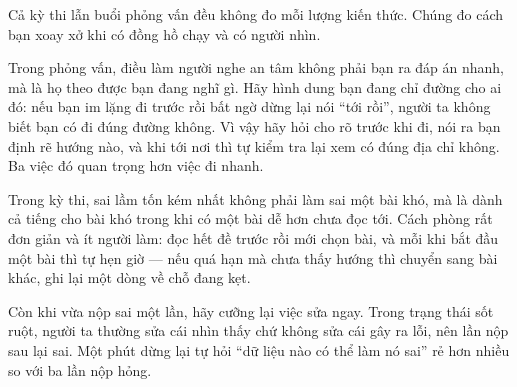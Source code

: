 \documentclass[../../algorithm.tex]{subfiles}
\begin{document}
\begin{dongian}
Cả kỳ thi lẫn buổi phỏng vấn đều không đo mỗi lượng kiến thức. Chúng đo cách bạn xoay xở khi có đồng hồ chạy và có người nhìn.

Trong phỏng vấn, điều làm người nghe an tâm không phải bạn ra đáp án nhanh, mà là họ theo được bạn đang nghĩ gì. Hãy hình dung bạn đang chỉ đường cho ai đó: nếu bạn im lặng đi trước rồi bất ngờ dừng lại nói ``tới rồi'', người ta không biết bạn có đi đúng đường không. Vì vậy hãy hỏi cho rõ trước khi đi, nói ra bạn định rẽ hướng nào, và khi tới nơi thì tự kiểm tra lại xem có đúng địa chỉ không. Ba việc đó quan trọng hơn việc đi nhanh.

Trong kỳ thi, sai lầm tốn kém nhất không phải làm sai một bài khó, mà là dành cả tiếng cho bài khó trong khi có một bài dễ hơn chưa đọc tới. Cách phòng rất đơn giản và ít người làm: đọc hết đề trước rồi mới chọn bài, và mỗi khi bắt đầu một bài thì tự hẹn giờ --- nếu quá hạn mà chưa thấy hướng thì chuyển sang bài khác, ghi lại một dòng về chỗ đang kẹt.

Còn khi vừa nộp sai một lần, hãy cưỡng lại việc sửa ngay. Trong trạng thái sốt ruột, người ta thường sửa cái nhìn thấy chứ không sửa cái gây ra lỗi, nên lần nộp sau lại sai. Một phút dừng lại tự hỏi ``dữ liệu nào có thể làm nó sai'' rẻ hơn nhiều so với ba lần nộp hỏng.
\end{dongian}
\end{document}
